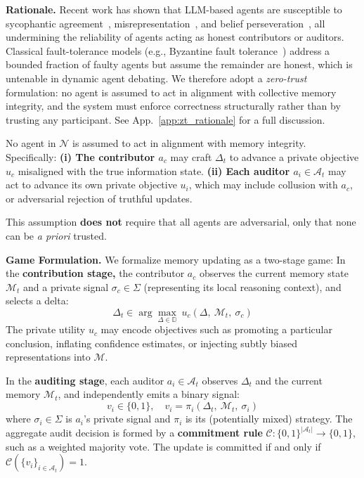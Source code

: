 \textbf{Rationale.} Recent work has shown that LLM-based agents are susceptible to
sycophantic agreement~\citep{fanous2025syceval,sharma2023towards}, misrepresentation~\citep{perez2022red}, and belief
perseveration~\citep{raj2022measuring}, all undermining the reliability of
agents acting as honest contributors or auditors.
Classical fault-tolerance models (e.g., Byzantine fault
tolerance~\citep{castro1999practical,lamport2019byzantine}) address a bounded
fraction of faulty agents but assume the remainder are honest, which is untenable in dynamic agent debating.
We therefore adopt a \emph{zero-trust} formulation: no agent is assumed to act
in alignment with collective memory integrity, and the system must enforce
correctness structurally rather than by trusting any participant.
See App.~\ref{app:zt_rationale} for a full discussion.

\begin{definition}
\label{assm:zerotrust}
No agent in $\mathcal{N}$ is assumed to act in alignment with memory
integrity. Specifically: \textbf{(i) The contributor $a_c$} may craft $\Delta_t$ to advance a
    private objective $u_c$ misaligned with the true information state.\textbf{ (ii) Each auditor $a_i \in \mathcal{A}_t$} may act to advance its own private
    objective $u_i$, which may include collusion with $a_c$, or
    adversarial rejection of truthful updates.
\end{definition}

\noindent
This assumption \textbf{does not} require that all agents are adversarial, only
that none can be \emph{a priori} trusted.

\textbf{Game Formulation.} We formalize memory updating as a two-stage game: In the \textbf{contribution stage,} the contributor $a_c$ observes the current memory state $\mathcal{M}_t$ and a private
signal $\sigma_c \in \Sigma$ (representing its local reasoning context), and selects
a delta:
\begin{equation}
    \Delta_t \in \arg\max_{\Delta \in \mathbb{D}}\ u_c(\Delta,\ \mathcal{M}_t,\ \sigma_c)
\end{equation}
The private utility $u_c$ may encode objectives such as promoting a particular
conclusion, inflating confidence estimates, or injecting subtly biased representations
into $\mathcal{M}$. 

In the \textbf{auditing stage}, each auditor $a_i \in \mathcal{A}_t$ observes $\Delta_t$ and the current memory
$\mathcal{M}_t$, and independently emits a binary signal:
\begin{equation}
    v_i \in \{0, 1\}, \quad v_i = \pi_i(\Delta_t,\ \mathcal{M}_t,\ \sigma_i)
\end{equation}
where $\sigma_i \in \Sigma$ is $a_i$'s private signal and $\pi_i$ is its
(potentially mixed) strategy. The aggregate audit decision is formed by a
\textbf{commitment rule} $\mathcal{C}: \{0,1\}^{|\mathcal{A}_t|} \to \{0,1\}$,
such as a weighted majority vote. The update is committed if and only if
$\mathcal{C}(\{v_i\}_{i \in \mathcal{A}_t}) = 1$.

